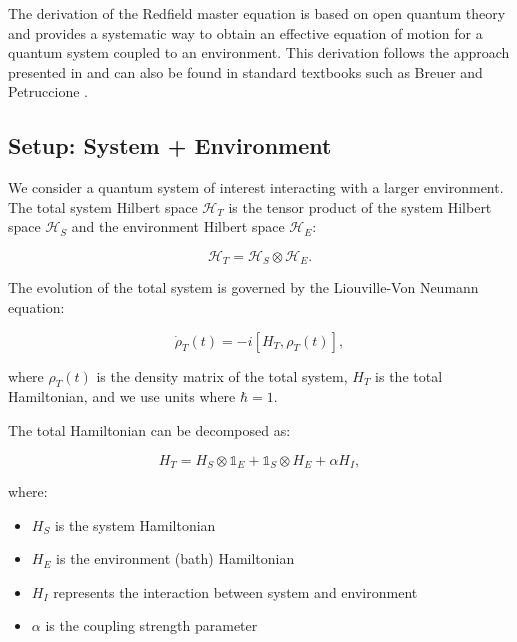 The derivation of the Redfield master equation is based on open quantum theory and provides a systematic way to obtain an effective equation of motion for a quantum system coupled to an environment. This derivation follows the approach presented in \cite{manzano2020shortintroductionlindblad} and can also be found in standard textbooks such as Breuer and Petruccione \cite{breuerpetruccione2009theoryopenquantum}.

\subsection{Setup: System + Environment}

We consider a quantum system of interest interacting with a larger environment. The total system Hilbert space $\mathcal{H}_T$ is the tensor product of the system Hilbert space $\mathcal{H}_S$ and the environment Hilbert space $\mathcal{H}_E$:

\begin{equation}
	\mathcal{H}_T = \mathcal{H}_S \otimes \mathcal{H}_E.
	\label{eq:Total_Hilbert_Space}
\end{equation}

The evolution of the total system is governed by the Liouville-Von Neumann equation:

\begin{equation}
	\dot{\rho}_T(t) = -i[H_T, \rho_T(t)],
	\label{eq:Von_Neumann_Equation}
\end{equation}

where $\rho_T(t)$ is the density matrix of the total system, $H_T$ is the total Hamiltonian, and we use units where $\hbar = 1$.

The total Hamiltonian can be decomposed as:

\begin{equation}
	H_T = H_S \otimes \mathbb{1}_E + \mathbb{1}_S \otimes H_E + \alpha H_I,
	\label{eq:Total_Hamiltonian}
\end{equation}

where:
\begin{itemize}
	\item $H_S$ is the system Hamiltonian
	\item $H_E$ is the environment (bath) Hamiltonian
	\item $H_I$ represents the interaction between system and environment
	\item $\alpha$ is the coupling strength parameter
\end{itemize}

